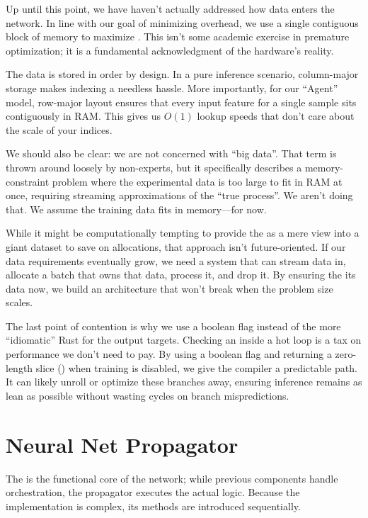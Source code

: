 Up until this point, we have haven't actually addressed how data enters the network. In line with our goal of minimizing overhead, we use a single contiguous block of memory to maximize . This isn't some academic exercise in premature optimization; it is a fundamental acknowledgment of the hardware's reality. \par The data is stored in  order by design. In a pure inference scenario, column-major storage makes indexing a needless hassle. More importantly, for our \enquote{Agent} model, row-major layout ensures that every input feature for a single sample sits contiguously in RAM. This gives us $O(1)$ lookup speeds that don't care about the scale of your indices. \par We should also be clear: we are not concerned with \enquote{big data}. That term is thrown around loosely by non-experts, but it specifically describes a memory-constraint problem where the experimental data is too large to fit in RAM at once, requiring streaming approximations of the \enquote{true process}. We aren't doing that. We assume the training data fits in memory—for now. \par While it might be computationally tempting to provide the  as a mere view into a giant dataset to save on allocations, that approach isn't future-oriented. If our data requirements eventually grow, we need a system that can stream data in, allocate a batch that owns that data, process it, and drop it. By ensuring the   its data now, we build an architecture that won't break when the problem size scales. \par The last point of contention is why we use a boolean flag instead of the more \enquote{idiomatic} Rust  for the output targets. Checking an  inside a hot loop is a tax on performance we don't need to pay. By using a boolean flag and returning a zero-length slice () when training is disabled, we give the compiler a predictable path. It can likely unroll or optimize these branches away, ensuring inference remains as lean as possible without wasting cycles on branch mispredictions.
\newpage\section{Neural Net Propagator}
The  is the functional core of the network; while previous components handle orchestration, the propagator executes the actual logic. Because the implementation is complex, its methods are introduced sequentially.
